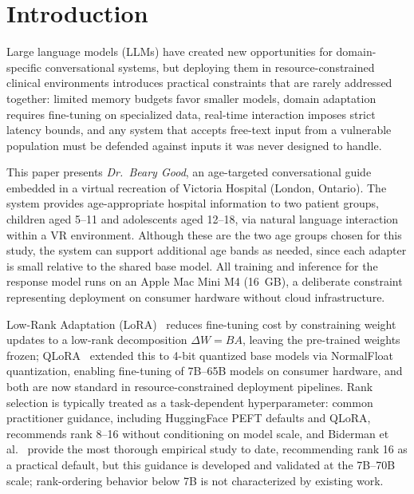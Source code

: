 \documentclass[pdflatex,sn-mathphys-num]{sn-jnl}%
\begin{document}

\maketitle

\section{Introduction}\label{sec1}

Large language models (LLMs) have created new opportunities for domain-specific conversational systems, but deploying them in resource-constrained clinical environments introduces practical constraints that are rarely addressed together: limited memory budgets favor smaller models, domain adaptation requires fine-tuning on specialized data, real-time interaction imposes strict latency bounds, and any system that accepts free-text input from a vulnerable population must be defended against inputs it was never designed to handle.

This paper presents \textit{Dr.\ Beary Good}, an age-targeted conversational guide embedded in a virtual recreation of Victoria Hospital (London, Ontario). The system provides age-appropriate hospital information to two patient groups, children aged 5--11 and adolescents aged 12--18, via natural language interaction within a VR environment. Although these are the two age groups chosen for this study, the system can support additional age bands as needed, since each adapter is small relative to the shared base model. All training and inference for the response model runs on an Apple Mac Mini M4 (16~GB), a deliberate constraint representing deployment on consumer hardware without cloud infrastructure.

Low-Rank Adaptation (LoRA)~\cite{hu2022lora} reduces fine-tuning cost by constraining weight updates to a low-rank decomposition $\Delta W = BA$, leaving the pre-trained weights frozen; QLoRA~\cite{dettmers2023qlora} extended this to 4-bit quantized base models via NormalFloat quantization, enabling fine-tuning of 7B--65B models on consumer hardware, and both are now standard in resource-constrained deployment pipelines. Rank selection is typically treated as a task-dependent hyperparameter: common practitioner guidance, including HuggingFace PEFT defaults and QLoRA, recommends rank 8--16 without conditioning on model scale, and Biderman et al.~\cite{biderman2024lora} provide the most thorough empirical study to date, recommending rank 16 as a practical default, but this guidance is developed and validated at the 7B--70B scale; rank-ordering behavior below 7B is not characterized by existing work.
\end{document}
